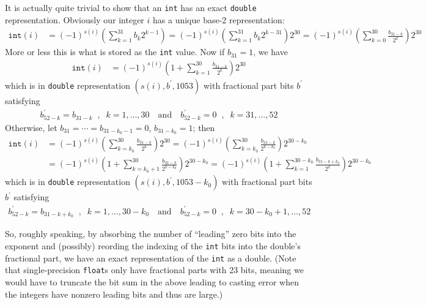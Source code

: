 \documentclass[11pt, oneside]{amsart}   	%
\begin{document}
It is actually quite trivial to show that an \texttt{int} has an exact \texttt{double} representation. Obviously our integer $i$ has a unique base-2 representation: 
\begin{align*}
    \texttt{int}(i) 
        &= (-1)^{s(i)}\left( \sum_{k=1}^{31} b_{k} 2^{k-1} \right)
            = (-1)^{s(i)}\left( \sum_{k=1}^{31} b_{k} 2^{k-31} \right) 2^{30}
            = (-1)^{s(i)}\left( \sum_{k=0}^{30} \frac{b_{31-k}}{2^{k}} \right) 2^{30}
\end{align*}
More or less this is what is stored as the \texttt{int} value. Now if $b_{31} = 1$, we have 
\begin{align*}
    \texttt{int}(i) 
        &= (-1)^{s(i)}\left( 1 + \sum_{k=1}^{30} \frac{b_{31-k}}{2^{k}} \right) 2^{30}
\end{align*}
which is in \texttt{double} representation $(s(i),b^\prime,1053)$ with fractional part bits $b^\prime$ satisfying
\begin{align*}
    b^\prime_{52-k} = b_{31-k} \;\;,\;\; k = 1,\dotsc,30
    \quad\text{and}\quad
    b^\prime_{52-k} = 0 \;\;,\;\; k = 31,\dotsc,52
\end{align*}
Otherwise, let $b_{31} = \dotsb = b_{31-k_0-1} = 0$, $b_{31-k_0} = 1$; then 
\begin{align*}
    \texttt{int}(i) 
        &= (-1)^{s(i)}\left( \sum_{k=k_0}^{30} \frac{b_{31-k}}{2^{k}} \right) 2^{30} 
        = (-1)^{s(i)}\left( \sum_{k=k_0}^{30} \frac{b_{31-k}}{2^{k-k_0}} \right) 2^{30-k_0} \\
        &= (-1)^{s(i)}\left( 1 + \sum_{k=k_0+1}^{30} \frac{b_{31-k}}{2^{k-k_0}} \right) 2^{30-k_0}
        = (-1)^{s(i)}\left( 1 + \sum_{k=1}^{30-k_0} \frac{b_{31-k+k_0}}{2^{k}} \right) 2^{30-k_0} 
\end{align*}
which is in \texttt{double} representation $(s(i),b^\prime,1053-k_0)$ with fractional part bits $b^\prime$ satisfying
\begin{align*}
    b^\prime_{52-k} = b_{31-k+k_0} \;\;,\;\; k = 1,\dotsc,30-k_0
    \quad\text{and}\quad
    b^\prime_{52-k} = 0 \;\;,\;\; k = 30-k_0+1,\dotsc,52
\end{align*}

So, roughly speaking, by absorbing the number of ``leading'' zero bits into the exponent and (possibly) reording the indexing of the \texttt{int} bits into the double's fractional part, we have an exact representation of the \texttt{int} as a double. (Note that single-precision \texttt{float}s only have fractional parts with 23 bits, meaning we would have to truncate the bit sum in the above leading to casting error when the integers have nonzero leading bits and thus are large.)
\end{document}
